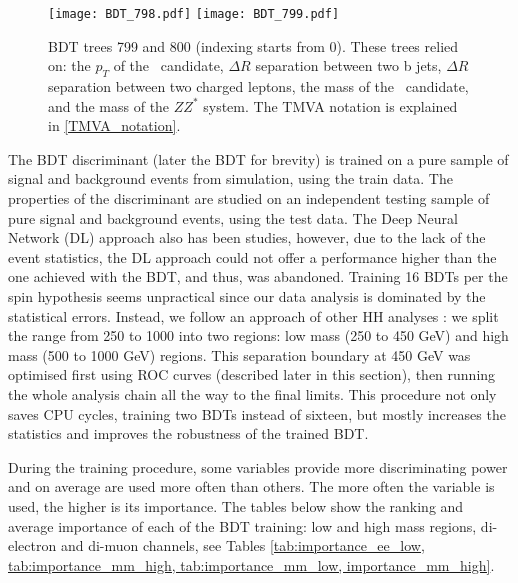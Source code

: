 \begin{figure}[H]
  \begin{center}
    \texttt{[image: BDT\_798.pdf]}
    \texttt{[image: BDT\_799.pdf]}\\
     \caption{BDT trees 799 and 800 (indexing starts from 0). These trees relied on: the $p_T$ of the \Zll~candidate, 
     $\Delta R$ separation between two b jets,
     $\Delta R$ separation between two charged leptons, 
      the mass of the \HBB~candidate, and the mass of the $ZZ^*$ system. The TMVA notation is explained in \ref{TMVA_notation}.}       
     \label{fig:bdt_trees_3}
  \end{center}
\end{figure}
           
The BDT discriminant (later the BDT for brevity) is trained on a pure sample of signal and background events from simulation, using the train data. The  properties of the discriminant are studied on an independent testing sample of pure signal and background events, using the test data. The Deep Neural Network (DL) approach also has been studies, however, due to the lack of the event statistics, the DL approach could not offer a performance higher than the one achieved with the BDT, and thus, was abandoned. Training 16 BDTs per the spin hypothesis seems unpractical since our data analysis is dominated by the statistical errors. Instead, we follow an approach of other HH analyses \cite{HH_combination}: we split the range from 250 to 1000 into two regions: low mass (250 to 450 GeV) and high mass (500 to 1000 GeV) regions. This separation boundary at 450 GeV was optimised first using ROC curves (described later in this section), then running the whole analysis chain all the way to the final limits. This procedure not only saves CPU cycles, training two BDTs instead of sixteen, but mostly increases the statistics and improves the robustness of the trained BDT. 
           
During the training procedure, some variables provide more discriminating power and on average are used more often than others. The more often the variable is used, the higher is its importance. The tables below show the ranking and average importance of each of the BDT training: low and high mass regions, di-electron and di-muon channels, see Tables \ref{tab:importance_ee_low, tab:importance_mm_high, tab:importance_mm_low, importance_mm_high}. 

